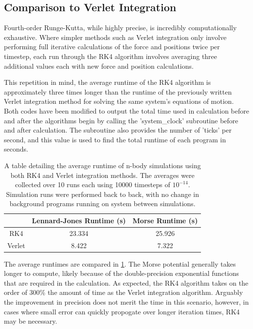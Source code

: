 \documentclass[12pt]{article}
\begin{document}
\subsection*{Comparison to Verlet Integration}
Fourth-order Runge-Kutta, while highly precise, is incredibly computationally exhaustive.  Where simpler methods such as Verlet integration only involve performing full iterative calculations of the force and positions twice per timestep, each run through the RK4 algorithm involves averaging three additional values each with new force and position calculations.

This repetition in mind, the average runtime of the RK4 algorithm is approximately three times longer than the runtime of the previously written Verlet integration method for solving the same system's equations of motion. \autocite{me}  Both codes have been modified to output the total time used in calculation before and after the algorithms begin by calling the 'system\_clock' subroutine before and after calculation.  The subroutine also provides the number of 'ticks' per second, and this value is used to find the total runtime of each program in seconds.

\begin{table}[h!]
\begin{center}
\begin{tabular}{|c|cc|}
\hline
\quad & Lennard-Jones Runtime (s) & Morse Runtime (s) \\
\hline
RK4 & 23.334 & 25.926 \\
Verlet & 8.422 & 7.322\\
\hline
\end{tabular}
\end{center}
\label{runtimes}
\caption{A table detailing the average runtime of n-body simulations using both RK4 and Verlet integration methods.  The averages were collected over 10 runs each using 10000 timesteps of $10^{-14}$.  Simulation runs were performed back to back, with no change in background programs running on system between simulations.}
\end{table}

The average runtimes are compared in \ref{runtimes}.  The Morse potential generally takes longer to compute, likely because of the double-precision exponential functions that are required in the calculation.  As expected, the RK4 algorithm takes on the order of 300\% the amount of time as the Verlet integration algorithm.  Arguably the improvement in precision does not merit the time in this scenario, however, in cases where small error can quickly propogate over longer iteration times, RK4 may be necessary.
\end{document}
